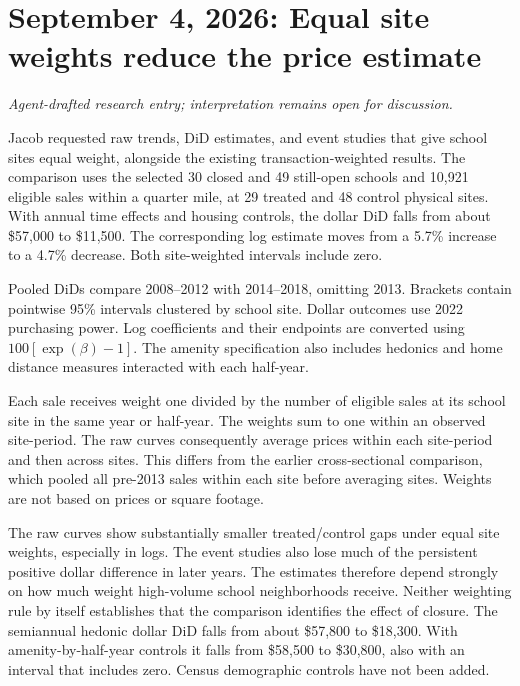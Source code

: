 \section*{September 4, 2026: Equal site weights reduce the price estimate}
\textit{Agent-drafted research entry; interpretation remains open for discussion.}

Jacob requested raw trends, DiD estimates, and event studies that give school
sites equal weight, alongside the existing transaction-weighted results.
The comparison uses the selected 30 closed and 49 still-open schools and
10,921 eligible sales within a quarter mile, at 29 treated and 48 control
physical sites. With annual time effects and housing
controls, the dollar DiD falls from about \$57,000 to \$11,500. The corresponding
log estimate moves from a 5.7\% increase to a 4.7\% decrease. Both site-weighted
intervals include zero.

\begin{center}
\scriptsize

\end{center}
{\footnotesize Pooled DiDs compare 2008--2012 with 2014--2018, omitting 2013.
Brackets contain pointwise 95\% intervals clustered by school site. Dollar
outcomes use 2022 purchasing power. Log coefficients and their endpoints are
converted using $100[\exp(\beta)-1]$. The amenity specification also includes
hedonics and home distance measures interacted with each half-year.}

Each sale receives weight one divided by the number of eligible sales at its
school site in the same year or half-year. The weights sum to one within
an observed site-period. The raw curves consequently average prices within
each site-period and then across sites. This differs from the earlier
cross-sectional comparison, which pooled all pre-2013 sales within each site
before averaging sites. Weights are not based on prices or square footage.

The raw curves show substantially smaller treated/control gaps under equal
site weights, especially in logs. The event studies also lose much of the
persistent positive dollar difference in later years. The estimates therefore
depend strongly on how much weight high-volume
school neighborhoods receive. Neither weighting rule by itself establishes
that the comparison identifies the effect of closure. The
semiannual hedonic dollar DiD falls from about \$57,800 to \$18,300. With
amenity-by-half-year controls it falls from \$58,500 to \$30,800, also with an
interval that includes zero. Census demographic controls have not been added.

